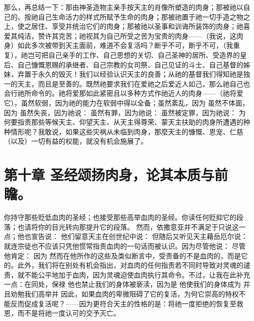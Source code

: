 那么，再总结一下：那由神圣造物主亲手按天主的肖像所塑造的肉身；那被祂以自己的、按祂自己生命活力的样式所赋予生命的肉身；那被祂置于祂一切手造之物之上，使之居住、享受并统治它们的肉身；那被祂以圣事和训诲所装饰的肉身；祂喜爱其纯洁，赞许其克苦；祂视其为自己所受之苦为宝贵的肉身——（我说，这肉身）如此多次被带到天主面前，难道不会复活吗？断乎不可，断乎不可，（我重复），祂岂可把自己亲手的工作、自己思想的关切、自己圣神的居所、受造界的皇后、自己慷慨恩赐的承继者、自己宗教的女司祭、自己见证的斗士、自己基督的姊妹，弃置于永久的毁灭！我们以经验认识天主的良善；从祂的基督我们得知祂是独一的天主，而且是至善的。既然祂要求我们在爱祂之后爱近人如己，那么祂自己也会行祂所命令的。祂将爱那如此紧密且以多种方式作祂近人的肉身——（祂将爱它），虽然软弱，因为祂的能力在软弱中得以全备；虽然紊乱，因为 虽然不体面，因为 虽然失丧，因为祂说： 虽然有罪，因为祂说： 虽然被定罪，因为祂说： 为何要指责那些等候天主、仰望天主、从天主得尊荣、蒙天主扶助的肉身所遭遇的种种情形呢？我敢说，如果这些灾祸从未临到肉身，那麼天主的慷慨、恩宠、仁慈（以及）一切有益的权能，就没有机会施展了。\par


\section{第十章 圣经颂扬肉身，论其本质与前瞻。}

你持守那些贬低血肉的圣经；也接受那些高举血肉的圣经。你读任何贬抑它的段落；也请将你的目光转向那提升它的段落。  然而，依撒意亚并不满足于只说这一点；他也宣告说：  他们留意天主在创世纪中说： 但随后又听见天主藉岳厄尔说：  就连宗徒也不应该只凭他惯常指责血肉的一句话而被认识。因为尽管他说：  尽管他肯定：  因为  然而在他所作的这些及类似断言中，受责备的不是血肉的，而是它的。此外，我们将在别处有机会指出，对血肉的任何指责若不同时导致对灵魂的谴责，就不能公平地加于血肉，因为灵魂迫使血肉执行其命令。不过，让我在此补充一点：在同处，保禄  他也禁止我们的身体被亵渎，因为是  他使我们的身体成为  并且劝勉我们高举并 因此，如果血肉的卑微阻碍了它的复活，为何它崇高的特权不能反而促成复活呢？——因为更符合天主的性格的是：将祂一度拒绝的恢复至救恩，而不是将祂一度认可的交予灭亡。\par

